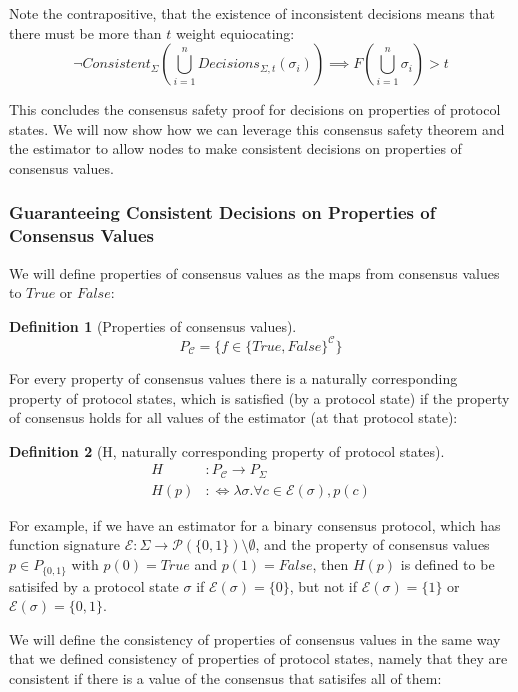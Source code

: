 \documentclass{article}
\theoremstyle{definition}
\newtheorem{defn}{Definition}[section]
\begin{document}
Note the contrapositive, that the existence of inconsistent decisions means that there must be more than $t$ weight equiocating:
$$
\neg Consistent_\Sigma(\bigcup_{i=1}^n Decisions_{\Sigma,t}(\sigma_i)) \implies F(\bigcup_{i=1}^n \sigma_i) > t
$$

This concludes the consensus safety proof for decisions on properties of protocol states. We will now show how we can leverage this consensus safety theorem and the estimator to allow nodes to make consistent decisions on properties of consensus values.

\subsubsection{Guaranteeing Consistent Decisions on Properties of Consensus Values}

We will define properties of consensus values as the maps from consensus values to $True$ or $False$:

\begin{defn}[Properties of consensus values]
$$
P_{\mathcal{C}} = \{ f \in \{True, False\}^\mathcal{C} \}
$$
\end{defn}

For every property of consensus values there is a naturally corresponding property of protocol states, which is satisfied (by a protocol state) if the property of consensus holds for all values of the estimator (at that protocol state):

\begin{defn}[H, naturally corresponding property of protocol states]
\begin{align}
H&: P_{\mathcal{C}}  \to P_\Sigma \\
H(p) &:\Leftrightarrow \lambda \sigma . \forall c \in \mathcal{E}(\sigma), p(c)
\end{align}
\end{defn}

For example, if we have an estimator for a binary consensus protocol, which has function signature $\mathcal{E}: \Sigma \to \mathcal{P}(\{0,1\})\setminus \emptyset$, and the property of consensus values $p \in P_{\{0, 1\}}$ with $p(0) = True$ and $p(1) = False$, then $H(p)$ is defined to be satisifed by a protocol state $\sigma$ if $\mathcal{E}(\sigma) = \{0\}$, but not if $\mathcal{E}(\sigma) = \{1\}$ or $\mathcal{E}(\sigma) = \{0, 1\}$.

We will define the consistency of properties of consensus values in the same way that we defined consistency of properties of protocol states, namely that they are consistent if there is a value of the consensus that satisifes all of them:
\end{document}
